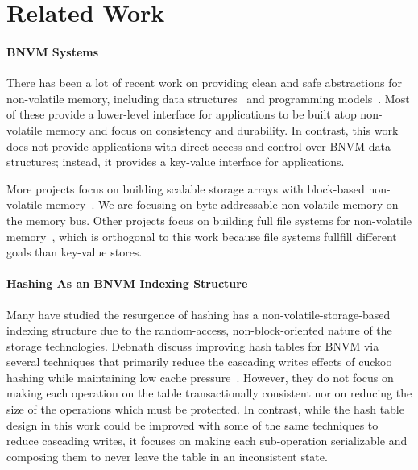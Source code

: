 \section{Related Work}

\paragraph{BNVM Systems}

There has been a lot of recent work on providing clean and safe abstractions for
non-volatile memory, including data
structures~\cite{coburn:asplos11,hu:atc17,Yang:2015,Venkataraman:2011} and programming
models~\cite{ren:micro15,volos:asplos11,condit:sosp09,guerra:atc12,Narayanan:2012}.
Most of these provide a lower-level interface for applications
to be built atop non-volatile memory and focus on consistency and durability. In contrast, this work does not provide
applications with direct access and control over BNVM data structures; instead,
it provides a key-value interface for applications.

More projects focus on building scalable storage arrays with block-based
non-volatile memory~\cite{Marmol:2014,caulfield:micro10,lim:sosp11,wu:atc15,debnath:vldb10}. We are focusing
on byte-addressable non-volatile memory on the memory bus. Other projects focus
on building full file systems for non-volatile
memory~\cite{wu:asplos94,xu:fast16,xu:sosp17,dulloor:eurosys14}, which is orthogonal to this work because file
systems fullfill different goals than key-value stores.

\paragraph{Hashing As an BNVM Indexing Structure}

Many have studied the resurgence of hashing has a non-volatile-storage-based
indexing structure due to the random-access,
non-block-oriented nature of the storage technologies. Debnath \etal discuss
improving hash tables for BNVM via several techniques that primarily reduce the
cascading writes effects of cuckoo hashing while maintaining low cache
pressure~\cite{Debnath:2016ht}.
However, they do not focus on making each operation on the table transactionally
consistent nor on reducing the size of the operations which must be protected.
In contrast, while the hash table design in this work could be improved with
some of the same techniques to reduce cascading writes, it focuses on making
each sub-operation serializable and composing them to never leave the table in
an inconsistent state.

